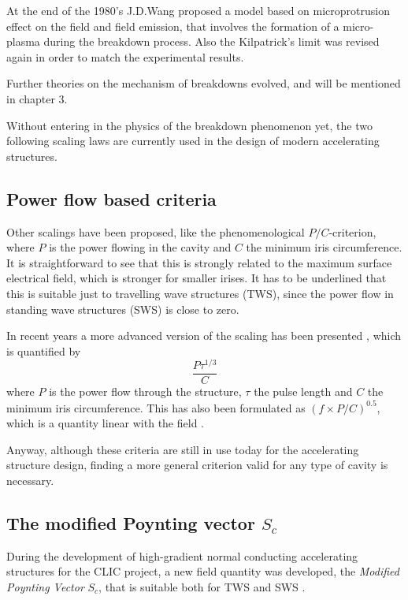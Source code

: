 At the end of the 1980's J.D.Wang proposed a model based on microprotrusion effect on the field and field emission, that involves the formation of a micro-plasma during the breakdown process. Also the Kilpatrick's limit was revised again in order to match the experimental results. \cite{Wang:1986, kilp:story}

Further theories on the mechanism of breakdowns evolved, and will be mentioned in chapter 3.

Without entering in the physics of the breakdown phenomenon yet, the two following scaling laws are currently used in the design of modern accelerating structures.

\subsection[Power flow based criteria]{Power flow based criteria}

Other scalings have been proposed, like the phenomenological $P/C$-criterion, where $P$ is the power flowing in the cavity and $C$ the minimum iris circumference. It is straightforward to see that this is strongly related to the maximum surface electrical field, which is stronger for smaller irises. It has to be underlined that this is suitable just to travelling wave structures (TWS), since the power flow in standing wave structures (SWS) is close to zero. 

In recent years a more advanced version of the scaling has been presented \cite{Wuensch:932674}, which is quantified by
\begin{equation}
\frac{P \tau^{1/3}}{C}
\end{equation}
where $P$ is the power flow through the structure, $\tau$ the pulse length and $C$ the minimum iris circumference. This has also been formulated as $(f \times P/C )^{0.5}$, which is a quantity linear with the field \cite{Wuensch:1004189}.

Anyway, although these criteria are still in use today for the accelerating structure design, finding a more general criterion valid for any type of cavity is necessary.

\subsection{The modified Poynting vector $S_c$}

During the development of high-gradient normal conducting accelerating structures for the CLIC project, a new field quantity was developed, the \textit{Modified Poynting Vector} $S_c$, that is suitable both for TWS and SWS \cite{Grudiev:newLoc}.

